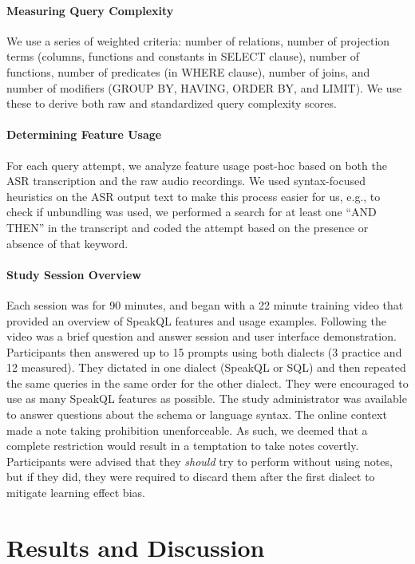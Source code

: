 \paragraph{\textbf{Measuring Query Complexity}} 
We use a series of weighted criteria: number of relations, number of projection terms (columns, functions and constants in SELECT clause), number of functions, number of predicates (in WHERE clause), number of joins, and number of modifiers (GROUP BY, HAVING, ORDER BY, and LIMIT). 
We use these to derive both raw and standardized query complexity scores. 

\paragraph{\textbf{Determining Feature Usage}} 
For each query attempt, we analyze feature usage post-hoc based on both the ASR transcription and the raw audio recordings. 
We used syntax-focused heuristics on the ASR output text to make this process easier for us, e.g., to check if unbundling was used, we performed a search for at least one ``AND THEN'' in the transcript and coded the attempt based on the presence or absence of that keyword.



\paragraph{\textbf{Study Session Overview}}
Each session was for 90 minutes, and began with a 22 minute training video that provided an overview of SpeakQL features and usage examples. 
Following the video was a brief question and answer session and user interface demonstration.
Participants then answered up to 15 prompts using both dialects (3 practice and 12 measured). 
They dictated in one dialect (SpeakQL or SQL) and then repeated the same queries in the same order for the other dialect. They were encouraged to use as many SpeakQL features as possible. 
The study administrator was available to answer questions about the schema or language syntax.
The online context made a note taking prohibition unenforceable. 
As such, we deemed that a complete restriction would result in a temptation to take notes covertly. 
Participants were advised that they \emph{should} try to perform without using notes, but if they did, they were required to discard them after the first dialect to mitigate learning effect bias.




\section{Results and Discussion}


